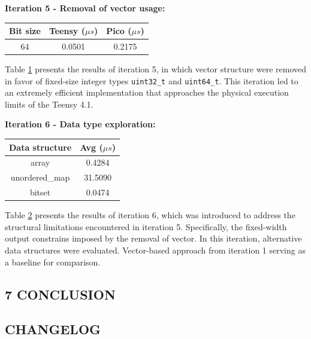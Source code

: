 \textbf{Iteration 5 - Removal of vector usage:}

\begin{table}[ht]\begin{tabular}{|c|c|c|} \hline \textbf{Bit size} &
\multicolumn{1}{c|}{\textbf{Teensy ($\mu s$)}} &
\multicolumn{1}{c|}{\textbf{Pico ($\mu s$)}} \\ \hline 64 & 0.0501 & 0.2175 \\
\hline \end{tabular} \label{tab:iter5}\end{table}

Table \ref{tab:iter5} presents the results of iteration 5, in which vector structure were removed in favor of fixed-size integer types \texttt{uint32\_t} and \texttt{uint64\_t}. This iteration led to an extremely efficient implementation that approaches the physical execution limits of the Teensy 4.1.

\textbf{Iteration 6 - Data type exploration:}

\begin{table}[ht]\begin{tabular}{|c|c|} \hline \textbf{Data structure} &
\multicolumn{1}{c|}{\textbf{Avg ($\mu s$)}} \\ \hline array & 0.4284 \\
unordered_map & 31.5090 \\ bitset & 0.0474 \\ \hline \end{tabular}
\label{tab:iter6}\end{table}

Table \ref{tab:iter6} presents the results of iteration 6, which was introduced to address the structural limitations encountered in iteration 5. Specifically, the fixed-width output constrains imposed by the removal of vector. In this iteration, alternative data structures were evaluated. Vector-based approach from iteration 1 serving as a baseline for comparison.

\hypertarget{conclusion}{%
\subsection{7 CONCLUSION}\label{conclusion}}

\hypertarget{changelog}{%
\subsection{CHANGELOG}\label{changelog}}

